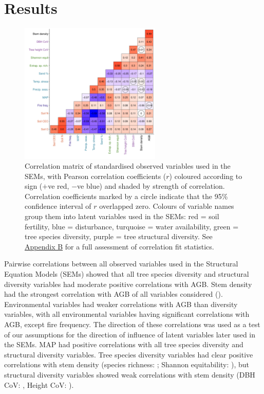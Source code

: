 \documentclass[11pt,a4paper]{article}
\begin{document}
\section{Results}

\begin{figure}[H]
\centering
	\includegraphics[width=0.6\textwidth]{corr_mat}
	\caption{Correlation matrix of standardised observed variables used in the SEMs, with Pearson correlation coefficients ($r$) coloured according to sign ($+$ve red, $-$ve blue) and shaded by strength of correlation. Correlation coefficients marked by a circle indicate that the 95\% confidence interval of $r$ overlapped zero. Colours of variable names group them into latent variables used in the SEMs: red = soil fertility, blue = disturbance, turquoise = water availability, green = tree species diversity, purple = tree structural diversity. See \hyperref[appendixb]{Appendix B} for a full assessment of correlation fit statistics.}
	\label{corr_mat}
\end{figure}

Pairwise correlations between all observed variables used in the Structural Equation Models (SEMs) showed that all tree species diversity and structural diversity variables had moderate positive correlations with AGB. Stem density had the strongest correlation with AGB of all variables considered (\ccib{}). Environmental variables had weaker correlations with AGB than diversity variables, with all environmental variables having significant correlations with AGB, except fire frequency. The direction of these correlations was used as a test of our assumptions for the direction of influence of latent variables later used in the SEMs. MAP had positive correlations with all tree species diversity and structural diversity variables. Tree species diversity variables had clear positive correlations with stem density (species richness: \ccsi{}; Shannon equitability: \ccei{}), but structural diversity variables showed weak correlations with stem density (DBH CoV: \ccdvi{}, Height CoV: \cchvi{}).
\end{document}
